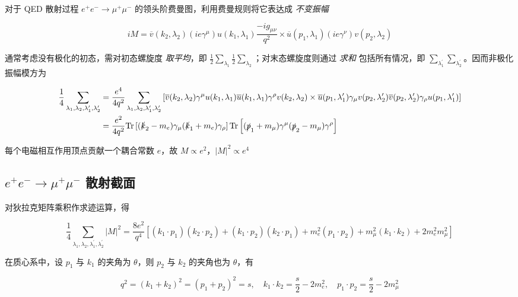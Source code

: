 对于 QED 散射过程 $e^+ e^- \to \mu^+ \mu^-$ 的领头阶费曼图，利用费曼规则将它表达成 \emph{不变振幅}

\begin{equation}
    iM = \overline{v}(k_2, \lambda_2) (ie\gamma^\mu) u(k_1, \lambda_1) \frac{-i g_{\mu\nu}}{q^2} \times \overline{u}(p_1, \lambda_1) (ie\gamma^\nu) v(p_2, \lambda_2)
\end{equation}

通常考虑没有极化的初态，需对初态螺旋度 \emph{取平均}，即 $\frac{1}{2}\sum_{\lambda_1}\frac{1}{2}\sum_{\lambda_2}$；对末态螺旋度则通过 \emph{求和} 包括所有情况，即 $\sum_{\lambda_1^\prime} \sum_{\lambda_2^\prime}$。因而非极化振幅模方为

\begin{align}
    \frac{1}{4} \sum_{\lambda_1, \lambda_2, \lambda_1^\prime, \lambda_2^\prime} &= \frac{e^4}{4 q^2} \sum_{\lambda_1, \lambda_2, \lambda_1^\prime, \lambda_2^\prime} \left[\overline{v}(k_2, \lambda_2) \gamma^\mu u(k_1, \lambda_1) \overline{u}(k_1, \lambda_1) \gamma^\rho v(k_2, \lambda_2) \times \overline{u}(p_1, \lambda_1^\prime) \gamma_\mu v(p_2, \lambda_2^\prime) \overline{v}(p_2, \lambda_2^\prime) \gamma_\rho u(p_1, \lambda_1^\prime)\right] \\
    &= \frac{e^2}{4 q^2} \mathrm{Tr}\left[(\slashed{k}_2-m_e)\gamma_\mu(\slashed{k}_1+m_e)\gamma_\rho\right] \mathrm{Tr}\left[(\slashed{p}_1+m_\mu)\gamma^\mu(\slashed{p}_2-m_\mu)\gamma^\rho\right]
\end{align}

每个电磁相互作用顶点贡献一个耦合常数 $e$，故 $M \propto e^2$，$|M|^2 \propto e^4$

\subsection{\texorpdfstring{$e^+ e^- \to \mu^+ \mu^-$}{e+e- -> mu+mu-} 散射截面}

对狄拉克矩阵乘积作求迹运算，得

\begin{equation}
    \frac{1}{4} \sum_{\lambda_1, \lambda_2, \lambda_1^\prime, \lambda_2^\prime} |M|^2 = \frac{8 e^2}{q^4} \left[(k_1 \cdot p_1)(k_2 \cdot p_2) + (k_1 \cdot p_2)(k_2 \cdot p_1) + m_e^2 (p_1 \cdot p_2) + m_\mu^2 (k_1 \cdot k_2) + 2 m_e^2 m_\mu^2\right]
\end{equation}

在质心系中，设 $p_1$ 与 $k_1$ 的夹角为 $\theta$，则 $p_2$ 与 $k_2$ 的夹角也为 $\theta$，有

\begin{equation}
    q^2 = (k_1 + k_2)^2 = (p_1 + p_2)^2 = s, \quad k_1 \cdot k_2 = \frac{s}{2} - 2 m_e^2, \quad p_1 \cdot p_2 = \frac{s}{2} - 2 m_\mu^2
\end{equation}

